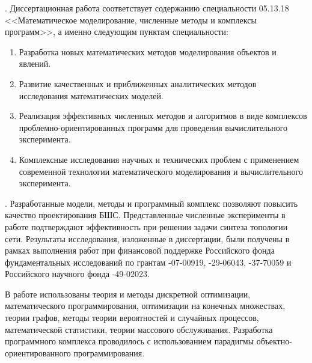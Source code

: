 {\fieldresearch}. Диссертационная работа соответствует содержанию специальности 05.13.18 <<Математическое моделирование, численные методы и комплексы программ>>, а именно следующим пунктам специальности:
\begin{enumerate}
    \item Разработка новых математических методов моделирования объектов и явлений.
    \item Развитие качественных и приближенных аналитических методов исследования математических моделей.
    \item Реализация эффективных численных методов и алгоритмов в виде комплексов проблемно-ориентированных программ для проведения вычислительного эксперимента.
    \item Комплексные исследования научных и технических проблем с применением современной технологии математического моделирования и вычислительного эксперимента.
\end{enumerate}

{\influence}. Разработанные модели, методы и программный комплекс позволяют повысить качество проектирования БШС. Представленные численные эксперименты в работе подтверждают эффективность при решении задачи синтеза топологии сети. Результаты исследования, изложенные в диссертации, были получены в рамках выполнения работ при финансовой поддержке Российского фонда фундаментальных исследований по грантам -07-00919,  -29-06043, -37-70059 и Российского научного фонда -49-02023. 


{\methods} В работе использованы теория и методы дискретной оптимизации, математического программирования, оптимизации на конечных множествах, теории графов, методы теории вероятностей и случайных процессов, математической статистики, теории массового обслуживания. Разработка программного комплекса проводилось с использованием парадигмы объектно-ориентированного программирования.

{}

